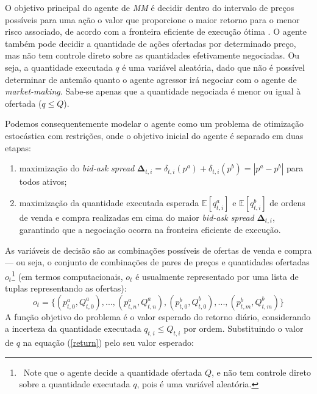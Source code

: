 O objetivo principal do agente de \textit{MM} é decidir dentro do intervalo de preços possíveis para uma ação o valor que proporcione o maior retorno para o menor risco associado, de acordo com a fronteira eficiente de execução ótima \citep{almgren2000}. O agente também pode decidir a quantidade de ações ofertadas por determinado preço, mas não tem controle direto sobre as quantidades efetivamente negociadas. Ou seja, a quantidade executada $q$ é uma variável aleatória, dado que não é possível determinar de antemão quanto o agente agressor irá negociar com o agente de \textit{market-making}. Sabe-se apenas que a quantidade negociada é menor ou igual à ofertada ($q \leq Q$). 

Podemos consequentemente modelar o agente como um problema de otimização estocástica com restrições, onde o objetivo inicial do agente é separado em duas etapas: 

\begin{enumerate}[]
	\item maximização do \textit{bid-ask spread} $\mathbf{\Delta}_{t,i} = \delta_{t, i}(p^{a}) + \delta_{t, i}(p^{b}) = |p^{a} - p^{b}|$  para todos ativos;
	
	\item maximização da quantidade executada esperada $\mathbb{E} [q_{t, i}^{a}]$ e $\mathbb{E} [q_{t, i}^{b}]$ de ordens de venda e compra realizadas em cima do maior \textit{bid-ask spread} $\mathbf{\Delta}_{t, i}$, garantindo que a negociação ocorra na fronteira eficiente de execução.
\end{enumerate}

As variáveis de decisão são as combinações possíveis de ofertas de venda e compra — ou seja, o conjunto de combinações de pares de preços e quantidades ofertadas $o_{t}$\footnote{\ Note que o agente decide a quantidade ofertada $Q$, e não tem controle direto sobre a quantidade executada $q$, pois é uma variável aleatória.} (em termos computacionais, $o_{t}$ é usualmente representado por uma lista de tuplas representando as ofertas):
\begin{equation}
	o_{t} = \{(p_{t, 0}^{a}, Q_{t, 0}^{a}), ..., (p_{t, n}^{a}, Q_{t, n}^{a}), (p_{t, 0}^{b}, Q_{t, 0}^{b}), ..., (p_{t, m}^{b}, Q_{t, m}^{b})\}
\end{equation} A função objetivo do problema é o valor esperado do retorno diário, considerando a incerteza da quantidade executada $q_{t, i} \leq Q_{t, i}$ por ordem. Substituindo o valor de $q$ na equação (\ref{return}) pelo seu valor esperado:

